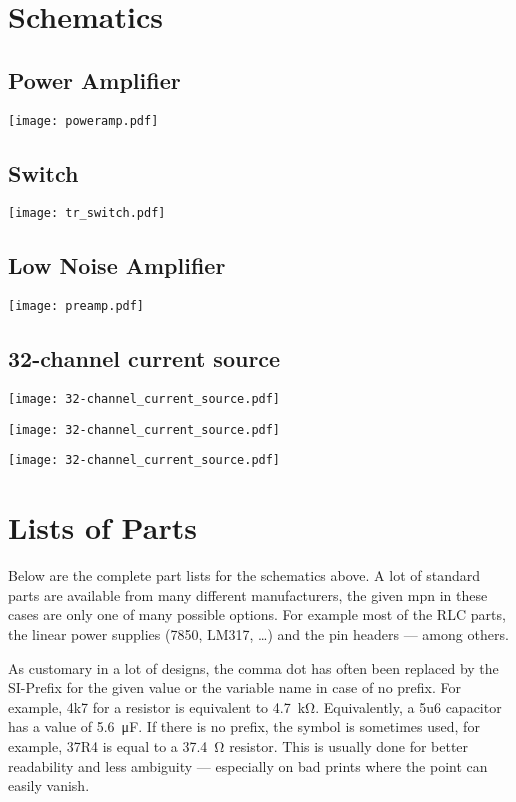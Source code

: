 \chapter{Schematics}
\section{Power Amplifier}
\texttt{[image: poweramp.pdf]}

\section{Switch}
\texttt{[image: tr\_switch.pdf]}

\section{Low Noise Amplifier}
\texttt{[image: preamp.pdf]}

\section{32-channel current source}
\texttt{[image: 32-channel\_current\_source.pdf]}

\texttt{[image: 32-channel\_current\_source.pdf]}

\texttt{[image: 32-channel\_current\_source.pdf]}

\chapter{Lists of Parts}
Below are the complete part lists for the schematics above. A lot of standard parts are available from many different manufacturers, the given \acrfull{mpn} in these cases are only one of many possible options. For example most of the RLC parts, the linear power supplies (7850, LM317, \ldots) and the pin headers --- among others.

As customary in a lot of designs, the comma dot has often been replaced by the SI-Prefix for the given value or the variable name in case of no prefix. For example, 4k7 for a resistor is equivalent to \qty{4.7}{\kilo\ohm}. Equivalently, a 5u6 capacitor has a value of \qty{5.6}{\micro\farad}. If there is no prefix, the symbol is sometimes used, for example, 37R4 is equal to a \qty{37.4}{\ohm} resistor. This is usually done for better readability and less ambiguity --- especially on bad prints where the point can easily vanish.

